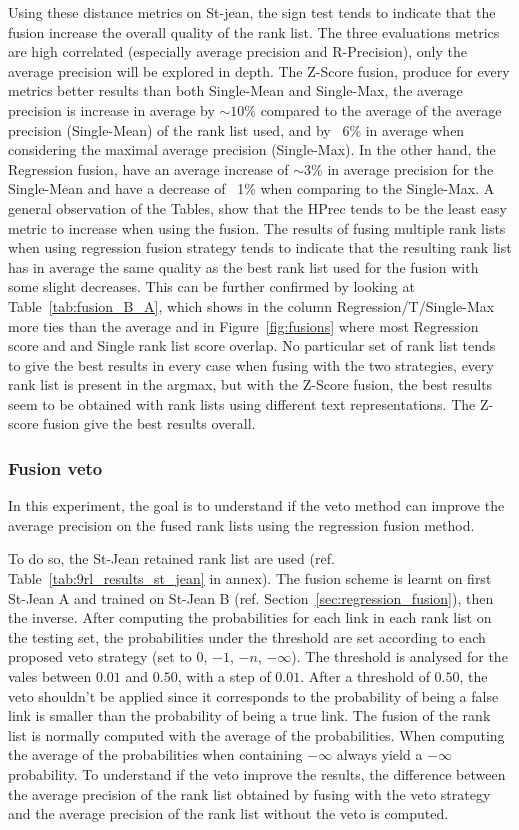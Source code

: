 Using these distance metrics on St-jean, the sign test tends to indicate that the fusion increase the overall quality of the rank list.
The three evaluations metrics are high correlated (especially average precision and R-Precision), only the average precision will be explored in depth.
The Z-Score fusion, produce for every metrics better results than both Single-Mean and Single-Max, the average precision is increase in average by $\sim 10$\% compared to the average of the average precision (Single-Mean) of the rank list used, and by ~6\% in average when considering the maximal average precision (Single-Max).
In the other hand, the Regression fusion, have an average increase of $\sim 3$\% in average precision for the Single-Mean and have a decrease of ~1\% when comparing to the Single-Max.
A general observation of the Tables, show that the HPrec tends to be the least easy metric to increase when using the fusion.
The results of fusing multiple rank lists when using regression fusion strategy tends to indicate that the resulting rank list has in average the same quality as the best rank list used for the fusion with some slight decreases.
This can be further confirmed by looking at Table~\ref{tab:fusion_B_A}, which shows in the column Regression/T/Single-Max more ties than the average and in Figure~\ref{fig:fusions} where most Regression score and and Single rank list score overlap.
No particular set of rank list tends to give the best results in every case when fusing with the two strategies, every rank list is present in the argmax, but with the Z-Score fusion, the best results seem to be obtained with rank lists using different text representations.
The Z-score fusion give the best results overall.

\subsubsection{Fusion veto}

In this experiment, the goal is to understand if the veto method can improve the average precision on the fused rank lists using the regression fusion method.

To do so, the St-Jean retained rank list are used (ref. Table~\ref{tab:9rl_results_st_jean} in annex).
The fusion scheme is learnt on first St-Jean A and trained on St-Jean B (ref. Section~\ref{sec:regression_fusion}), then the inverse.
After computing the probabilities for each link in each rank list on the testing set, the probabilities under the threshold are set according to each proposed veto strategy (set to $0$, $-1$, $-n$, $-\infty$).
The threshold is analysed for the vales between $0.01$ and $0.50$, with a step of $0.01$.
After a threshold of $0.50$, the veto shouldn't be applied since it corresponds to the probability of being a false link is smaller than the probability of being a true link.
The fusion of the rank list is normally computed with the average of the probabilities.
When computing the average of the probabilities when containing $-\infty$ always yield a $-\infty$ probability.
To understand if the veto improve the results, the difference between the average precision of the rank list obtained by fusing with the veto strategy and the average precision of the rank list without the veto is computed.

